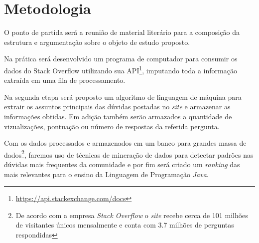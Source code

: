 
 
\chapter{Metodologia}\label{cap_exemplos}

O ponto de partida será a reunião de material literário para a composição da estrutura e argumentação sobre o objeto de estudo proposto.

Na prática será desenvolvido um programa de computador para consumir os dados do Stack Overflow utilizando sua API\footnote{\url{https://api.stackexchange.com/docs}}, imputando toda a informação extraída em uma fila de processamento.

Na segunda etapa será proposto um algoritmo de linguagem de máquina para extrair os assuntos principais das dúvidas postadas no \textit{site} e armazenar as informações obtidas. Em adição também serão armazados a quantidade de vizualizações, pontuação ou número de respostas da referida pergunta.  

Com os dados processados e armazenados em um banco para grandes massa de dados\footnote{De acordo com a empresa \textit{Stack Overflow} o \textit{site} recebe cerca de 101 milhões de visitantes únicos mensalmente e conta com 3.7 milhões de perguntas respondidas}, faremos uso de técnicas de mineração de dados para detectar padrões nas dúvidas mais frequentes da comunidade e por fim será criado um \textit{ranking} das mais relevantes para o ensino da Linguagem de Programação \emph{Java}. 

